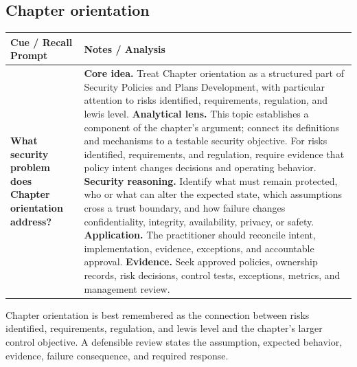 \documentclass[11pt]{article}
\newcommand{\CornellHeader}{%
\rowcolor{Navy}\color{white}\bfseries Cue / Recall Prompt & \color{white}\bfseries Notes / Analysis\\\hline}
\newcommand{\CornellRow}[2]{%
\cellcolor{CueGray}\RaggedRight\textbf{#1} & \RaggedRight #2\\\hline}
\begin{document}
\subsection*{Chapter orientation}
\begin{longtable}{>{\RaggedRight\arraybackslash}p{}|>{\RaggedRight\arraybackslash}p{}}
\CornellHeader
\CornellRow{What security problem does Chapter orientation address?}{\textbf{Core idea.} Treat Chapter orientation as a structured part of Security Policies and Plans Development, with particular attention to risks identified, requirements, regulation, and lewis level. \textbf{Analytical lens.} This topic establishes a component of the chapter's argument; connect its definitions and mechanisms to a testable security objective. For risks identified, requirements, and regulation, require evidence that policy intent changes decisions and operating behavior. \textbf{Security reasoning.} Identify what must remain protected, who or what can alter the expected state, which assumptions cross a trust boundary, and how failure changes confidentiality, integrity, availability, privacy, or safety. \textbf{Application.} The practitioner should reconcile intent, implementation, evidence, exceptions, and accountable approval. \textbf{Evidence.} Seek approved policies, ownership records, risk decisions, control tests, exceptions, metrics, and management review.}
\end{longtable}
\begin{topicsummary}
Chapter orientation is best remembered as the connection between risks identified, requirements, regulation, and lewis level and the chapter's larger control objective. A defensible review states the assumption, expected behavior, evidence, failure consequence, and required response.
\end{topicsummary}
\end{document}
